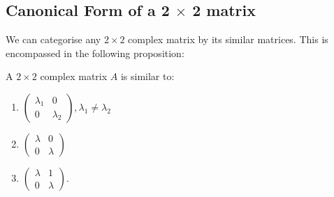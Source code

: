 \documentclass[../Main.tex]{subfiles}
\begin{document}
\subsection{Canonical Form of a 2 \texorpdfstring{$\times$}{x} 2 matrix}
We can categorise any $2 \times 2$ complex matrix by its similar matrices. This is encompassed in the following proposition:
\begin{proposition}
    A $2 \times 2$ complex matrix $A$ is similar to:
    \begin{enumerate}
        \item $\begin{pmatrix}
            \lambda_1 & 0 \\
            0 & \lambda_2
        \end{pmatrix}, \lambda_1 \neq \lambda_2$
        \label{form2EVals}
        \item $\begin{pmatrix}
            \lambda & 0 \\
            0 & \lambda
        \end{pmatrix}$
        \label{form1EVal}
        \item $\begin{pmatrix}
            \lambda & 1 \\
            0 & \lambda
        \end{pmatrix}$.
        \label{formNonDiag}
    \end{enumerate}
\end{proposition}
\end{document}
